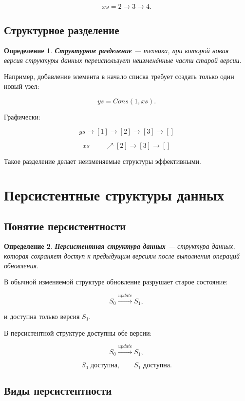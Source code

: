 \documentclass[12pt,a4paper]{article}
\newtheorem{definition}{Определение}
\begin{document}
\[
xs = 2 \to 3 \to 4.
\]

\subsection{Структурное разделение}

\begin{definition}
\textbf{Структурное разделение} --- техника, при которой новая версия структуры данных переиспользует неизменённые части старой версии.
\end{definition}

Например, добавление элемента в начало списка требует создать только один новый узел:

\[
ys = Cons(1, xs).
\]

Графически:

\[
ys \to [1] \to [2] \to [3] \to []
\]

\[
xs \quad\quad\ \nearrow [2] \to [3] \to []
\]

Такое разделение делает неизменяемые структуры эффективными.

\section{Персистентные структуры данных}

\subsection{Понятие персистентности}

\begin{definition}
\textbf{Персистентная структура данных} --- структура данных, которая сохраняет доступ к предыдущим версиям после выполнения операций обновления.
\end{definition}

В обычной изменяемой структуре обновление разрушает старое состояние:

\[
S_0 \xrightarrow{update} S_1,
\]

и доступна только версия $S_1$.

В персистентной структуре доступны обе версии:

\[
S_0 \xrightarrow{update} S_1,
\]

\[
S_0 \text{ доступна}, \qquad S_1 \text{ доступна}.
\]

\subsection{Виды персистентности}
\end{document}
